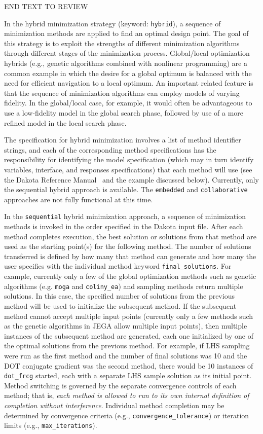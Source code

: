 END TEXT TO REVIEW

In the hybrid minimization strategy (keyword: \texttt{hybrid}), a
sequence of minimization methods are applied to find an optimal design
point. The goal of this strategy is to exploit the strengths of
different minimization algorithms through different stages of the
minimization process. Global/local optimization hybrids (e.g., genetic
algorithms combined with nonlinear programming) are a common example
in which the desire for a global optimum is balanced with the need for
efficient navigation to a local optimum. An important related feature
is that the sequence of minimization algorithms can employ models of
varying fidelity. In the global/local case, for example, it would
often be advantageous to use a low-fidelity model in the global search
phase, followed by use of a more refined model in the local search
phase.

The specification for hybrid minimization involves a list of
method identifier strings, and each of the corresponding method
specifications has the responsibility for identifying the model
specification (which may in turn identify variables, interface, and
responses specifications) that each method will use (see the Dakota
Reference Manual~\cite{RefMan} and the example discussed below).
Currently, only the sequential hybrid approach is available. The
\texttt{embedded} and \texttt{collaborative} approaches are
not fully functional at this time.

In the \texttt{sequential} hybrid minimization approach, a sequence
of minimization methods is invoked in the order specified in the
Dakota input file. After each method completes execution, 
the best solution or solutions from that method are used as the
starting point(s) for the following method. 
The number of solutions transferred 
is defined by how many that method can generate and how many the 
user specifies with the individual method keyword \texttt{final\_solutions}. 
For example, currently only a few of the global optimization methods such as 
genetic algorithms (e.g. \texttt{moga} and \texttt{coliny\_ea}) and 
sampling methods return multiple solutions.  In this case, 
the specified number of solutions from the previous 
method will be used to initialize the subsequent method.  If the subsequent 
method cannot accept multiple input points (currently only a few methods 
such as the genetic algorithms in JEGA allow multiple input points), then 
multiple instances of the subsequent method are generated, each one 
initialized by one of the optimal solutions from the previous method. 
For example, if LHS sampling were run as the first method and 
the number of final solutions was 10 and the DOT conjugate gradient 
was the second method, there would be 10 instances of \texttt{dot\_frcg} 
started, each with a separate LHS sample solution as its initial point. 
Method switching is governed
by the separate convergence controls of each method; that is,
\emph{each method is allowed to run to its own internal definition of
completion without interference}. Individual method completion may be
determined by convergence criteria (e.g.,
\texttt{convergence\_tolerance}) or iteration limits (e.g.,
\texttt{max\_iterations}).  

